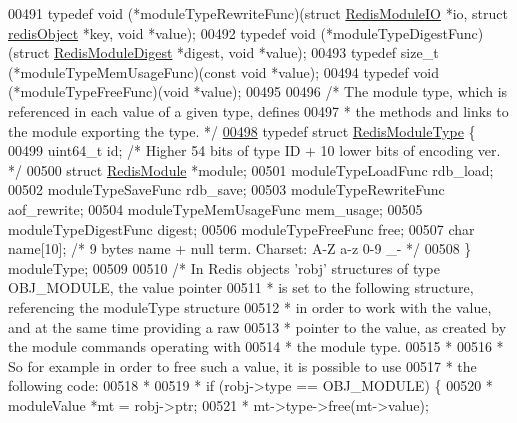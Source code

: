 \begin{DoxyCode}
{{{{{{00491 \textcolor{keyword}{typedef} \textcolor{keywordtype}{void} (*moduleTypeRewriteFunc)(\textcolor{keyword}{struct} \hyperlink{structRedisModuleIO}{RedisModuleIO} *io, \textcolor{keyword}{struct} 
      \hyperlink{structredisObject}{redisObject} *key, \textcolor{keywordtype}{void} *value);
00492 \textcolor{keyword}{typedef} \textcolor{keywordtype}{void} (*moduleTypeDigestFunc)(\textcolor{keyword}{struct} \hyperlink{structRedisModuleDigest}{RedisModuleDigest} *digest, \textcolor{keywordtype}{void} *value);
00493 \textcolor{keyword}{typedef} size\_t (*moduleTypeMemUsageFunc)(\textcolor{keyword}{const} \textcolor{keywordtype}{void} *value);
00494 \textcolor{keyword}{typedef} \textcolor{keywordtype}{void} (*moduleTypeFreeFunc)(\textcolor{keywordtype}{void} *value);
00495 
00496 \textcolor{comment}{/* The module type, which is referenced in each value of a given type, defines}
00497 \textcolor{comment}{ * the methods and links to the module exporting the type. */}
\hyperlink{structRedisModuleType}{00498} \textcolor{keyword}{typedef} \textcolor{keyword}{struct} \hyperlink{structRedisModuleType}{RedisModuleType} \{
00499     uint64\_t id; \textcolor{comment}{/* Higher 54 bits of type ID + 10 lower bits of encoding ver. */}
00500     \textcolor{keyword}{struct} \hyperlink{structRedisModule}{RedisModule} *module;
00501     moduleTypeLoadFunc rdb\_load;
00502     moduleTypeSaveFunc rdb\_save;
00503     moduleTypeRewriteFunc aof\_rewrite;
00504     moduleTypeMemUsageFunc mem\_usage;
00505     moduleTypeDigestFunc digest;
00506     moduleTypeFreeFunc free;
00507     \textcolor{keywordtype}{char} name[10]; \textcolor{comment}{/* 9 bytes name + null term. Charset: A-Z a-z 0-9 \_- */}
00508 \} moduleType;
00509 
00510 \textcolor{comment}{/* In Redis objects 'robj' structures of type OBJ\_MODULE, the value pointer}
00511 \textcolor{comment}{ * is set to the following structure, referencing the moduleType structure}
00512 \textcolor{comment}{ * in order to work with the value, and at the same time providing a raw}
00513 \textcolor{comment}{ * pointer to the value, as created by the module commands operating with}
00514 \textcolor{comment}{ * the module type.}
00515 \textcolor{comment}{ *}
00516 \textcolor{comment}{ * So for example in order to free such a value, it is possible to use}
00517 \textcolor{comment}{ * the following code:}
00518 \textcolor{comment}{ *}
00519 \textcolor{comment}{ *  if (robj->type == OBJ\_MODULE) \{}
00520 \textcolor{comment}{ *      moduleValue *mt = robj->ptr;}
00521 \textcolor{comment}{ *      mt->type->free(mt->value);}
}}}}}}
\end{DoxyCode}
